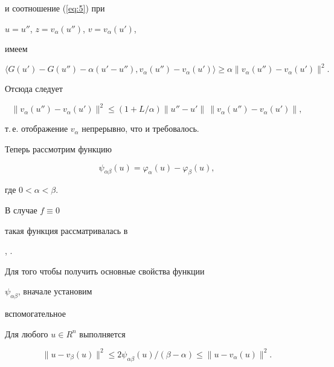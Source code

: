 и соотношение (\ref{eq:5}) при


$u=u''$, $z=v_{\alpha }(u'')$, $ v= v_{\alpha }(u')$,


имеем


$$


\langle G(u') - G(u'') - \alpha (u' - u''),


v_{\alpha }(u'') - v_{\alpha }(u') \rangle


\geq \alpha


\| v_{\alpha }(u'') - v_{\alpha }(u')\|^{2}.


$$


Отсюда следует


$$


\| v_{\alpha }(u'')- v_{\alpha }(u')\|^{2}\leq


(1 + L/\alpha)


\|u''-u'\|\, \| v_{\alpha }(u'')- v_{\alpha }(u')\| ,


$$


т.\,е. отображение $ v_{\alpha }$ непрерывно, что и требовалось.





Теперь рассмотрим функцию


\begin{equation} \label{eq:6}


\psi_{\alpha \beta }(u)= \varphi_{\alpha }(u) - \varphi_{\beta }(u),


\end{equation}


где $0< \alpha < \beta$.


В случае $f \equiv 0$


такая функция рассматривалась в 


\cite{Pen97}, \cite{YTF97}.





Для того чтобы получить основные свойства функции 


$ \psi_{\alpha \beta }$, вначале установим


вспомогательное





\begin{prop} \label{pr:1}


Для любого $u \in R^{n}$ выполняется


\begin{equation} \label{eq:7}


\| u - v_{\beta }(u)\|^{2} \leq


2 \psi_{\alpha \beta }(u) / (\beta -\alpha )


\leq


\| u - v_{\alpha }(u)\|^{2}.


\end{equation}


\end{prop}





